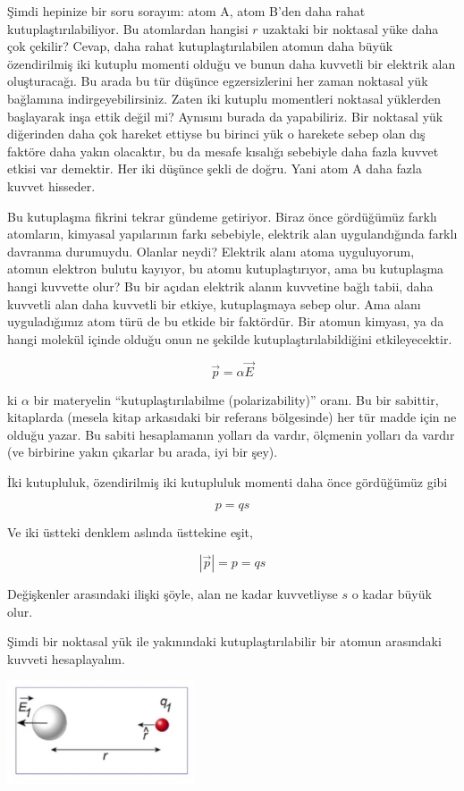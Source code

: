 \documentclass[12pt,fleqn]{article}\usepackage{../../common}
\begin{document}
Şimdi hepinize bir soru sorayım: atom A, atom B'den daha rahat
kutuplaştırılabiliyor. Bu atomlardan hangisi $r$ uzaktaki bir noktasal yüke daha
çok çekilir? Cevap, daha rahat kutuplaştırılabilen atomun daha büyük
özendirilmiş iki kutuplu momenti olduğu ve bunun daha kuvvetli bir elektrik alan
oluşturacağı. Bu arada bu tür düşünce egzersizlerini her zaman noktasal yük
bağlamına indirgeyebilirsiniz. Zaten iki kutuplu momentleri noktasal yüklerden
başlayarak inşa ettik değil mi? Aynısını burada da yapabiliriz. Bir noktasal yük
diğerinden daha çok hareket ettiyse bu birinci yük o harekete sebep olan dış
faktöre daha yakın olacaktır, bu da mesafe kısalığı sebebiyle daha fazla kuvvet
etkisi var demektir. Her iki düşünce şekli de doğru. Yani atom A daha fazla
kuvvet hisseder.

Bu kutuplaşma fikrini tekrar gündeme getiriyor. Biraz önce gördüğümüz farklı
atomların, kimyasal yapılarının farkı sebebiyle, elektrik alan uygulandığında
farklı davranma durumuydu. Olanlar neydi? Elektrik alanı atoma uyguluyorum,
atomun elektron bulutu kayıyor, bu atomu kutuplaştırıyor, ama bu kutuplaşma
hangi kuvvette olur? Bu bir açıdan elektrik alanın kuvvetine bağlı tabii, daha
kuvvetli alan daha kuvvetli bir etkiye, kutuplaşmaya sebep olur. Ama alanı
uyguladığımız atom türü de bu etkide bir faktördür. Bir atomun kimyası, ya da
hangi molekül içinde olduğu onun ne şekilde kutuplaştırılabildiğini
etkileyecektir.

$$ \vec{p} = \alpha \vec{E} $$

ki $\alpha$ bir materyelin ``kutuplaştırılabilme (polarizability)'' oranı. Bu
bir sabittir, kitaplarda (mesela kitap arkasıdaki bir referans bölgesinde) her
tür madde için ne olduğu yazar. Bu sabiti hesaplamanın yolları da vardır,
ölçmenin yolları da vardır (ve birbirine yakın çıkarlar bu arada, iyi bir şey).

İki kutupluluk, özendirilmiş iki kutupluluk momenti daha önce gördüğümüz gibi

$$ p = q s $$

Ve iki üstteki denklem aslında üsttekine eşit,

$$ |\vec{p}| = p = qs $$

Değişkenler arasındaki ilişki şöyle, alan ne kadar kuvvetliyse $s$ o kadar büyük
olur. 

Şimdi bir noktasal yük ile yakınındaki kutuplaştırılabilir bir atomun arasındaki
kuvveti hesaplayalım.

\includegraphics[width=15em]{03_14.png}
\end{document}

